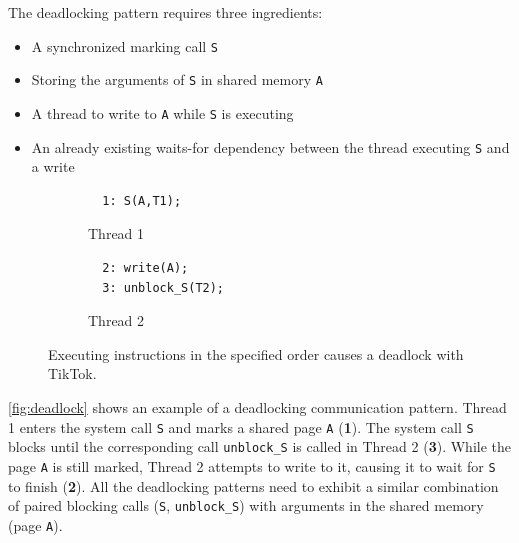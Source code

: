\documentclass[conference]{IEEEtran}
\newcommand{\sysname}{TikTok}
\begin{document}
The deadlocking pattern requires three ingredients:

\begin{itemize}
  \item A synchronized marking call \texttt{S}
  \item Storing the arguments of \texttt{S} in shared memory \texttt{A}
  \item A thread to write to \texttt{A} while \texttt{S} is executing
  \item An already existing waits-for dependency between the thread executing
  \texttt{S} and a write
\end{itemize}

\begin{figure}
  \centering
  \begin{subfigure}[b]{0.45\linewidth}
  \begin{minipage}{\linewidth}
  \begin{lstlisting}
  1: S(A,T1);  
  \end{lstlisting}
  \end{minipage}
  \caption{Thread 1}
  \end{subfigure}
  \hfill
  \begin{subfigure}[b]{0.45\linewidth}
  \begin{minipage}{\linewidth}
  \begin{lstlisting}
  2: write(A);
  3: unblock_S(T2);
  \end{lstlisting}  
  \end{minipage}
  \caption{Thread 2}
  \end{subfigure}
  \caption{Executing instructions in the specified order causes a deadlock with \sysname.}
  \label{fig:deadlock}
\end{figure}

\autoref{fig:deadlock} shows an example of a deadlocking communication pattern.
Thread 1 enters the system call \texttt{S} and marks a shared page \texttt{A}
(\textbf{1}). The system call \texttt{S} blocks until the corresponding call
\texttt{unblock\_S} is called in Thread 2 (\textbf{3}). While the page
\texttt{A} is still marked, Thread 2 attempts to write to it, causing it to wait
for \texttt{S} to finish (\textbf{2}). All the deadlocking patterns need to
exhibit a similar combination of paired blocking calls (\texttt{S},
\texttt{unblock\_S}) with arguments in the shared memory (page \texttt{A}).
\end{document}
